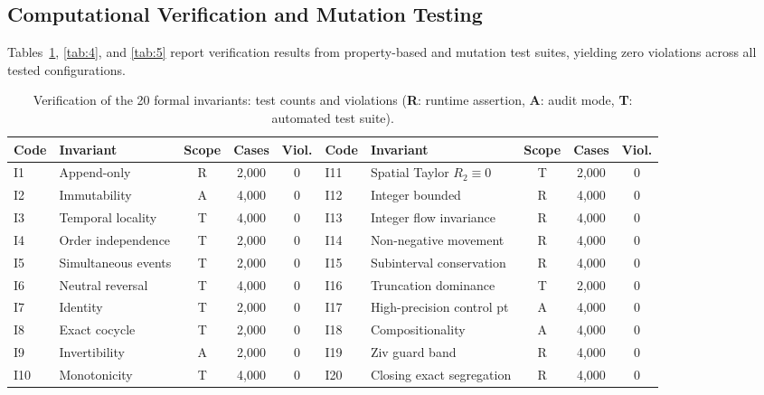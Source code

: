 \documentclass[11pt, a4paper]{article}
\theoremstyle{definition}
\theoremstyle{plain}
\theoremstyle{remark}
\begin{document}
\subsection{Computational Verification and Mutation Testing}\label{sec:6.4}

Tables~\ref{tab:3}, \ref{tab:4}, and \ref{tab:5} report verification results from property-based and mutation test suites, yielding zero violations across all tested configurations.

\begin{table}[htbp]
\centering
\small
\setlength{\tabcolsep}{3pt}
\begin{tabular}{@{}llccc@{\hspace{0.8em}}llccc@{}}
\toprule
\textbf{Code} & \textbf{Invariant} & \textbf{Scope} & \textbf{Cases} & \textbf{Viol.} & \textbf{Code} & \textbf{Invariant} & \textbf{Scope} & \textbf{Cases} & \textbf{Viol.} \\
\midrule
I1  & Append-only         & R & 2,000 & 0 & I11 & Spatial Taylor $R_2\equiv 0$ & T & 2,000 & 0 \\
I2  & Immutability        & A & 4,000 & 0 & I12 & Integer bounded             & R & 4,000 & 0 \\
I3  & Temporal locality   & T & 4,000 & 0 & I13 & Integer flow invariance     & R & 4,000 & 0 \\
I4  & Order independence  & T & 2,000 & 0 & I14 & Non-negative movement       & R & 4,000 & 0 \\
I5  & Simultaneous events & T & 2,000 & 0 & I15 & Subinterval conservation    & R & 4,000 & 0 \\
I6  & Neutral reversal    & T & 4,000 & 0 & I16 & Truncation dominance        & T & 2,000 & 0 \\
I7  & Identity            & T & 2,000 & 0 & I17 & High-precision control pt   & A & 4,000 & 0 \\
I8  & Exact cocycle       & T & 2,000 & 0 & I18 & Compositionality            & A & 4,000 & 0 \\
I9  & Invertibility       & A & 2,000 & 0 & I19 & Ziv guard band              & R & 4,000 & 0 \\
I10 & Monotonicity        & T & 4,000 & 0 & I20 & Closing exact segregation   & R & 4,000 & 0 \\
\bottomrule
\end{tabular}
\caption{Verification of the 20 formal invariants: test counts and violations (\textbf{R}: runtime assertion, \textbf{A}: audit mode, \textbf{T}: automated test suite).}
\label{tab:3}
\end{table}
\end{document}

